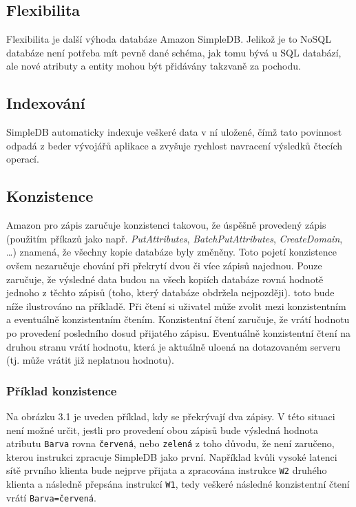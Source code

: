 \documentclass[oneside,12pt,final]{fithesis2}
\begin{document}
\subsection{Flexibilita}
Flexibilita je další výhoda databáze Amazon SimpleDB. Jelikož je to NoSQL databáze není potřeba mít pevně dané schéma, jak tomu bývá u SQL databází, ale nové atributy a entity mohou být přidávány takzvaně za pochodu.
\subsection{Indexování}
SimpleDB automaticky indexuje veškeré data v ní uložené, čímž tato povinnost odpadá z beder vývojářů aplikace a zvyšuje rychlost navracení výsledků čtecích operací.	
\subsection{Konzistence}
Amazon pro zápis zaručuje konzistenci takovou, že úspěšně provedený zápis (použitím příkazů jako např. \emph{PutAttributes}, \emph{BatchPutAttributes}, \emph{CreateDomain}, \dots) znamená, že všechny kopie databáze byly změněny. Toto pojetí konzistence ovšem nezaručuje chování při překrytí dvou či více zápisů najednou. Pouze zaručuje, že výsledné data budou na všech kopiích databáze rovná hodnotě jednoho z těchto zápisů (toho, který databáze obdržela nejpozději). toto bude níže ilustrováno na příkladě.
Při čtení si uživatel může zvolit mezi konzistentním a eventuálně konzistentním čtením. Konzistentní čtení zaručuje, že vrátí hodnotu po provedení posledního dosud přijatého zápisu. Eventuálně konzistentní čtení na druhou stranu vrátí hodnotu, která je aktuálně uloená na dotazovaném serveru (tj. může vrátit již neplatnou hodnotu).
\subsubsection{Příklad konzistence}
Na obrázku 3.1 je uveden příklad, kdy se překrývají dva zápisy. V této situaci není možné určit, jestli pro provedení obou zápisů bude výsledná hodnota atributu \verb<Barva< rovna \verb<červená<, nebo \verb<zelená< z toho důvodu, že není zaručeno, kterou instrukci zpracuje SimpleDB jako první. Například kvůli vysoké latenci sítě prvního klienta bude nejprve přijata a zpracována instrukce \verb<W2< druhého klienta a následně přepsána instrukcí \verb<W1<, tedy veškeré následné konzistentní čtení vrátí \verb<Barva=červená<.
\end{document}
